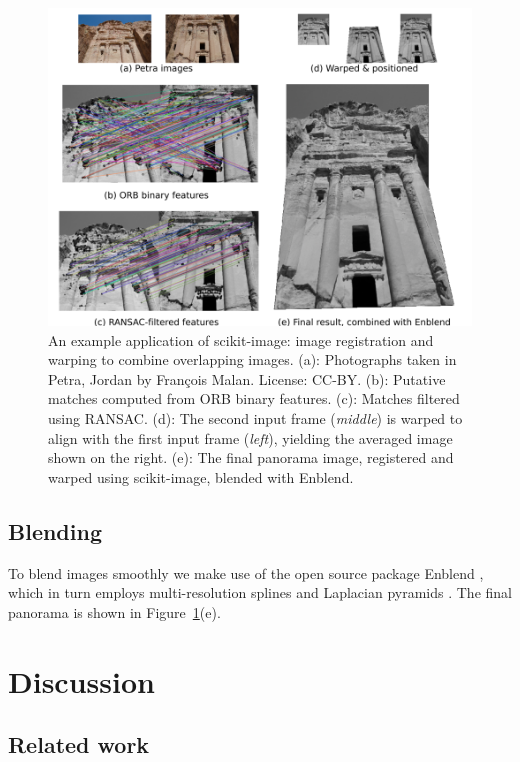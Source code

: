 \documentclass[fleqn,12pt]{wlpeerj}
\begin{document}
\begin{figure}
    \includegraphics[width=\columnwidth]{pano_new.png}
    \caption{An example application of scikit-image: image registration and warping to combine overlapping images. (a): Photographs taken in Petra, Jordan by François Malan. License: CC-BY. (b): Putative matches computed from ORB binary features. (c): Matches filtered using RANSAC. (d): The second input frame (\textit{middle}) is warped to align with the first input frame (\textit{left}), yielding the averaged image shown on the right. (e): The final panorama image, registered and warped using scikit-image, blended with Enblend.\label{fig:pano}}

\end{figure}


\subsection{Blending}
\label{sub:blending}

To blend images smoothly we make use of the open source package Enblend \citep{Enblend}, which in turn employs multi-resolution splines and Laplacian pyramids \citep{burt_adelson_0,burt_adelson_1}. The final panorama is shown in Figure~\ref{fig:pano}(e).


\section*{Discussion}
\label{sec:discussion}

\subsection*{Related work}
\end{document}
